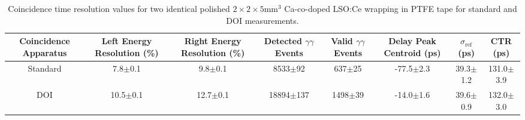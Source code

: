 \begin{table}
\caption{\label{tab:referencevals} Coincidence time resolution values for two identical polished $2\times2\times5$mm$^3$ Ca-co-doped LSO:Ce wrapping in PTFE tape for standard and DOI measurements.}
\begin{tabular}{cccccccc}
Coincidence Apparatus & Left Energy Resolution (\%) & Right Energy Resolution (\%) & Detected $\gamma\gamma$ Events & Valid $\gamma\gamma$ Events & Delay Peak Centroid (ps) & $\sigma_\textrm{ref}$ (ps) & CTR (ps)\\
\hline
Standard &   7.8$\pm$0.1 &   9.8$\pm$0.1 &    8533$\pm$92 &   637$\pm$25 &  -77.5$\pm$2.3 &   39.3$\pm$1.2 &  131.0$\pm$3.9 \\
DOI &  10.5$\pm$0.1 &  12.7$\pm$0.1 &  18894$\pm$137 &  1498$\pm$39 &  -14.0$\pm$1.6 &   39.6$\pm$0.9 &  132.0$\pm$3.0 \\
\hline
\end{tabular}
\end{table}